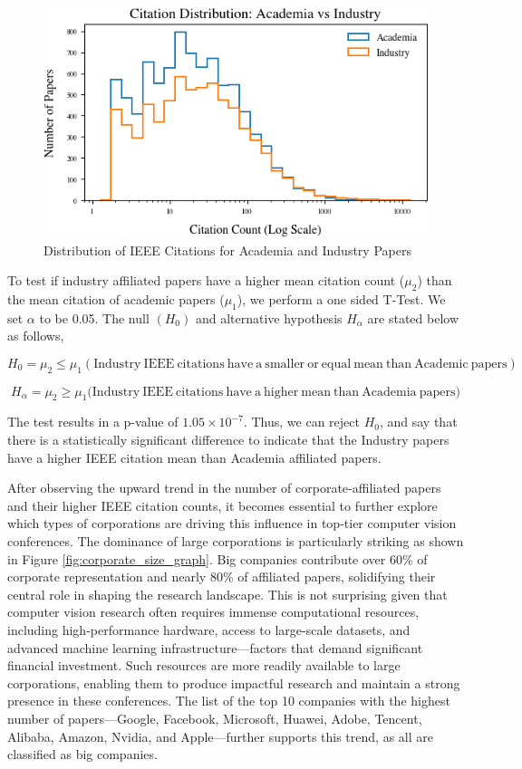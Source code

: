 \documentclass{article}
\begin{document}
\begin{figure}
    \centering
    \includegraphics[width=0.6\linewidth]{images/histogram_ieee_citations.png}
    \caption{Distribution of IEEE Citations for Academia and Industry Papers}
    \label{fig:ieee_citations}
\end{figure}

To test if industry affiliated papers have a higher mean citation count ($\mu_2$) than the mean citation of academic papers ($\mu_1$), we perform a one sided T-Test. We set $\alpha$ to be 0.05. The null $(H_0)$ and alternative hypothesis $H_\alpha$ are stated below as follows,

\[
H_0 = \mu_2 \leq \mu_1 (\mathrm{Industry \  IEEE \  citations \ have\  a \ smaller\  or\  equal\  mean \ than\  Academic\  papers})
\]

\[
H_\alpha = \mu_2 \geq \mu_1 (\mathrm{Industry \ IEEE\ citations \ have \ a \ higher\ mean \ than \ Academia \ papers)}
\]

The test results in a p-value of $1.05 \times 10^{-7}$. Thus, we can reject $H_0$, and say that there is a statistically significant difference to indicate that the Industry papers have a higher IEEE citation mean than Academia affiliated papers. 

After observing the upward trend in the number of corporate-affiliated papers and their higher IEEE citation counts, it becomes essential to further explore which types of corporations are driving this influence in top-tier computer vision conferences. The dominance of large corporations is particularly striking as shown in Figure \ref{fig:corporate_size_graph}. Big companies contribute over 60\% of corporate representation and nearly 80\% of affiliated papers, solidifying their central role in shaping the research landscape. This is not surprising given that computer vision research often requires immense computational resources, including high-performance hardware, access to large-scale datasets, and advanced machine learning infrastructure—factors that demand significant financial investment. Such resources are more readily available to large corporations, enabling them to produce impactful research and maintain a strong presence in these conferences. The list of the top 10 companies with the highest number of papers—Google, Facebook, Microsoft, Huawei, Adobe, Tencent, Alibaba, Amazon, Nvidia, and Apple—further supports this trend, as all are classified as big companies. 
\end{document}
